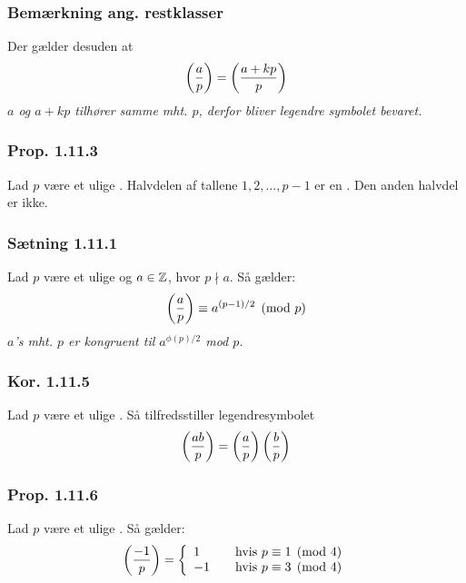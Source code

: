 \subsubsection{Bemærkning ang. restklasser}
\label{1.11.2}
Der gælder desuden at
\begin{equation*}
  \left(\frac{a}{p}\right) = \left(\frac{a+kp}{p}\right)
\end{equation*}
\textit{$a$ og $a+kp$ tilhører samme  mht. $p$, derfor
bliver legendre symbolet bevaret.}

\subsubsection{Prop. 1.11.3}
Lad $p$ være et ulige . Halvdelen af tallene $1, 2, \ldots, p
-1$ er en . Den anden halvdel er ikke.

\subsubsection{Sætning 1.11.1}
\label{Saetning 1.11.1}
Lad $p$ være et ulige  og $a \in \mathbb{Z}$, hvor $p \nmid a$. Så
gælder:
\begin{equation*}
  \left(\frac{a}{p}\right) \equiv a^{(p-1)/2} \pmod{p}
\end{equation*}
\textit{$a$'s  mht. $p$ er kongruent til
$a^{\phi(p)/2}$ mod $p$.}

\subsubsection{Kor. 1.11.5}
\label{1.11.5}
Lad $p$ være et ulige . Så tilfredsstiller legendresymbolet
\begin{equation*}
  \left(\frac{ab}{p}\right) = \left(\frac{a}{p}\right)\left(\frac{b}{p}\right)  
\end{equation*}

\subsubsection{Prop. 1.11.6}
Lad $p$ være et ulige . Så gælder:
\begin{equation*}
\left(\frac{-1}{p}\right) = \left\{
  \begin{array}{l l}
  1 & \quad \text{hvis $p \equiv 1 \pmod{4}$}\\
  -1 & \quad \text{hvis $p \equiv 3 \pmod{4}$}
  \end{array} \right.
\end{equation*}


